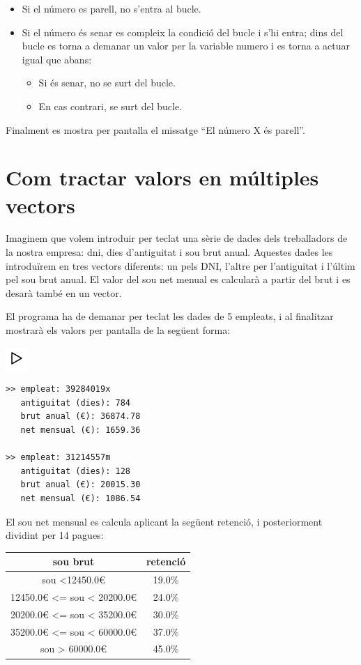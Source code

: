 \documentclass[]{book}
\newcommand{\euro}{€}
\providecommand{\tightlist}{%
  \setlength{\itemsep}{0pt}\setlength{\parskip}{0pt}}
\begin{document}
\begin{itemize}
\tightlist
\item
  Si el número es parell, no s'entra al bucle.
\item
  Si el número és senar es compleix la condició del bucle i s'hi entra;
  dins del bucle es torna a demanar un valor per la variable numero i es
  torna a actuar igual que abans:

  \begin{itemize}
  \tightlist
  \item
    Si és senar, no se surt del bucle.
  \item
    En cas contrari, se surt del bucle.
  \end{itemize}
\end{itemize}

Finalment es mostra per pantalla el missatge ``El número X és parell''.

\section{Com tractar valors en múltiples
vectors}\label{com-tractar-valors-en-multiples-vectors}

Imaginem que volem introduir per teclat una sèrie de dades dels
treballadors de la nostra empresa: dni, dies d'antiguitat i sou brut
anual. Aquestes dades les introduïrem en tres vectors diferents: un pels
DNI, l'altre per l'antiguitat i l'últim pel sou brut anual. El valor del
sou net menual es calcularà a partir del brut i es desarà també en un
vector.

El programa ha de demanar per teclat les dades de 5 empleats, i al
finalitzar mostrarà els valors per pantalla de la següent forma:

\includegraphics{./img/play.png}

\begin{verbatim}
>> empleat: 39284019x
   antiguitat (dies): 784
   brut anual (€): 36874.78
   net mensual (€): 1659.36

>> empleat: 31214557m
   antiguitat (dies): 128
   brut anual (€): 20015.30
   net mensual (€): 1086.54
\end{verbatim}

El sou net mensual es calcula aplicant la següent retenció, i
posteriorment dividint per 14 pagues:

\begin{longtable}[]{@{}cc@{}}
\toprule
sou brut & retenció\tabularnewline
\midrule
\endhead
sou \textless{}12450.0\euro{} & 19.0\%\tabularnewline
12450.0\euro{} \textless{}= sou \textless{} 20200.0\euro{} &
24.0\%\tabularnewline
20200.0\euro{} \textless{}= sou \textless{} 35200.0\euro{} &
30.0\%\tabularnewline
35200.0\euro{} \textless{}= sou \textless{} 60000.0\euro{} &
37.0\%\tabularnewline
sou \textgreater{} 60000.0\euro{} & 45.0\%\tabularnewline
\bottomrule
\end{longtable}
\end{document}

